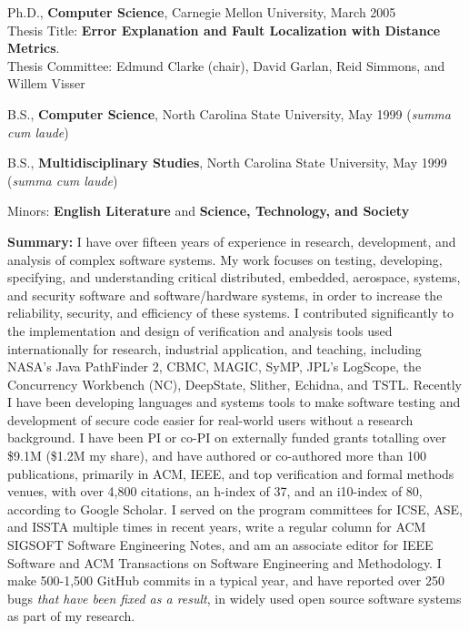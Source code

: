 \documentclass[ComputerScience]{vita}
\begin{document}
\begin{vita}


\begin{Education}
  \item Ph.D., {\bf Computer Science}, Carnegie Mellon University, March 2005\\ Thesis Title:  {\bf Error Explanation and Fault Localization with Distance Metrics}.\\Thesis Committee:  Edmund Clarke (chair), David Garlan, Reid Simmons, and Willem Visser

  \item B.S., {\bf Computer Science}, North Carolina State University, May 1999 (\emph{summa cum laude})
  \item B.S., {\bf Multidisciplinary Studies}, North Carolina State University, May 1999 (\emph{summa cum laude})
\item  \hspace{0.5in} Minors:  {\bf English Literature} and {\bf Science, Technology, and Society}
\end{Education}

\begin{Experience}
\item {\bf Summary:} I have over fifteen years of experience in
  research, development, and analysis of complex software systems.  My
  work focuses on testing, developing, specifying, and understanding
  critical distributed, embedded, aerospace, systems, and security
  software and software/hardware systems, in order to increase the
  reliability, security, and efficiency of these systems.  I
  contributed significantly to the implementation and design of
  verification and analysis tools used internationally for research,
  industrial application, and teaching, including NASA's Java
  PathFinder 2, CBMC, MAGIC, SyMP, JPL's LogScope, the Concurrency
  Workbench (NC), DeepState, Slither, Echidna, and TSTL.  Recently I have been developing languages
  and systems tools to make software testing and development of secure
  code easier for real-world users without a research background.
  I have been PI or co-PI on externally funded grants totalling over
  \$9.1M (\$1.2M my share), and have authored or co-authored more than
  100 publications, primarily in ACM, IEEE, and top verification and
  formal methods venues, with over 4,800 citations, an h-index of 37,
  and an i10-index of 80, according to Google Scholar.  I served on
  the program committees for ICSE, ASE, and ISSTA multiple times in
  recent years, write a regular column for ACM SIGSOFT Software
  Engineering Notes, and am an associate editor for IEEE Software and ACM Transactions on Software Engineering and Methodology.  I make 500-1,500 GitHub commits in a typical
  year, and have reported over 250 bugs \emph{that have been fixed as a result}, in widely used open source
  software systems as part of my research.



\end{Experience}
\end{vita}
\end{document}
